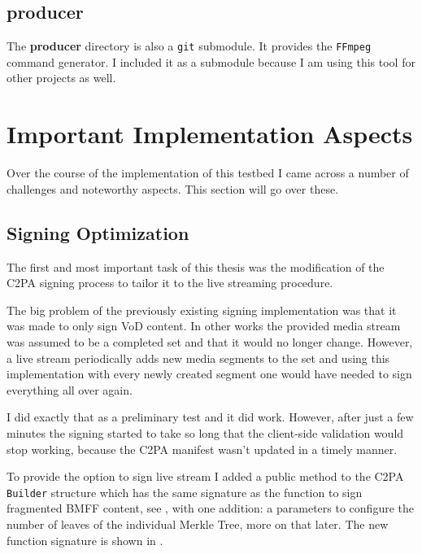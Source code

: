 \subsection{producer}

The \textbf{producer} directory is also a \texttt{git} submodule. It provides the \texttt{FFmpeg} command generator. I included it as a submodule because I am using this tool for other projects as well.


\section{Important Implementation Aspects\label{sec:implaspects}}

Over the course of the implementation of this testbed I came across a number of challenges and noteworthy aspects. This section will go over these.

\subsection{Signing Optimization\label{sec:optimization}}

The first and most important task of this thesis was the modification of the C2PA signing process to tailor it to the live streaming procedure.

The big problem of the previously existing signing implementation was that it was made to only sign VoD content. In other works the provided media stream was assumed to be a completed set and that it would no longer change. However, a live stream periodically adds new media segments to the set and using this implementation with every newly created segment one would have needed to sign everything all over again.

I did exactly that as a preliminary test and it did work. However, after just a few minutes the signing started to take so long that the client-side validation would stop working, because the C2PA manifest wasn't updated in a timely manner.

To provide the option to sign live stream I added a public method to the C2PA \texttt{Builder} structure which has the same signature as the function to sign fragmented BMFF content, see , with one addition: a parameters to configure the number of leaves of the individual Merkle Tree, more on that later. The new function signature is shown in .

